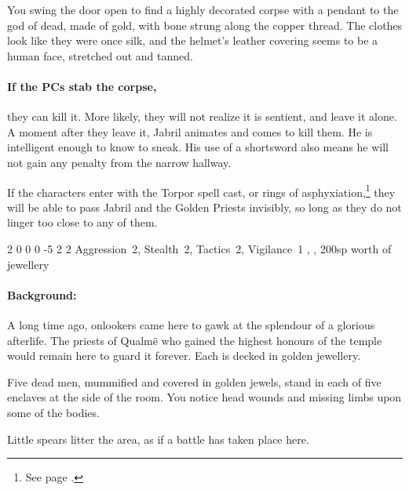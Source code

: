 \begin{multicols}{2}
\begin{boxtext}

  You swing the door open to find a highly decorated corpse with a pendant to the god of dead, made of gold, with bone strung along the copper thread.
  The clothes look like they were once silk, and the helmet's leather covering seems to be a human face, stretched out and tanned.

\end{boxtext}

\paragraph{If the PCs stab the corpse,}
they can kill it.
More likely, they will not realize it is sentient, and leave it alone.
A moment after they leave it, Jabril animates and comes to kill them.
He is intelligent enough to know to sneak.
His use of a shortsword also means he will not gain any penalty from the narrow hallway.

If the characters enter with the Torpor spell cast, or rings of asphyxiation,\footnote{See page \pageref{ring_asphyxiation}.} they will be able to pass Jabril and the Golden Priests invisibly, so long as they do not linger too close to any of them.


  {2}%
  {0}%
  {{0}%
  {0}%
  {-5}}%
  {2}%
  {2}%
  {Aggression~2, Stealth~2, Tactics~2, Vigilance~1}%
  {\shortsword, \completeplate, 200sp worth of jewellery}%
  {}


\paragraph{Background:}
A long time ago, onlookers came here to gawk at the splendour of a glorious afterlife.
The priests of Qualm\"{e} who gained the highest honours of the temple would remain here to guard it forever.
Each is decked in golden jewellery.

\begin{boxtext}

  Five dead men, mummified and covered in golden jewels, stand in each of five enclaves at the side of the room.
  You notice head wounds and missing limbs upon some of the bodies.

  Little spears litter the area, as if a battle has taken place here.


\end{boxtext}
\end{multicols}
